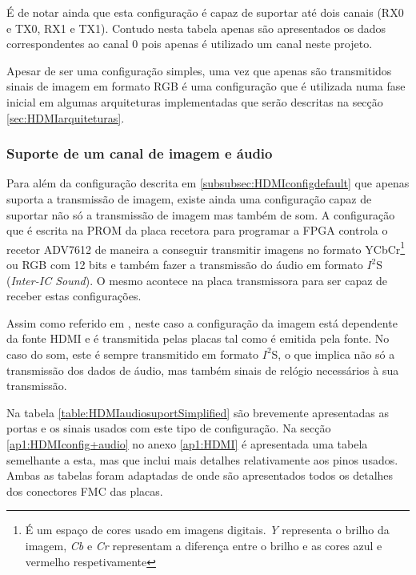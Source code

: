 É de notar ainda que esta configuração é capaz de suportar até dois canais (RX0 e TX0, RX1 e TX1). Contudo nesta tabela apenas são apresentados os dados correspondentes ao canal 0 pois apenas é utilizado um canal neste projeto. 

Apesar de ser uma configuração simples, uma vez que apenas são transmitidos sinais de imagem em formato RGB é uma configuração que é utilizada numa fase inicial em algumas arquiteturas implementadas que serão descritas na secção \ref{sec:HDMIarquiteturas}.

\subsubsection{Suporte de um canal de imagem e áudio} \label {subsubsec:HDMIconfig+audio}

Para além da configuração descrita em \ref{subsubsec:HDMIconfigdefault} que apenas suporta a transmissão de imagem, existe ainda uma configuração capaz de suportar não só a transmissão de imagem mas também de som. A configuração que é escrita na PROM da placa recetora para programar a FPGA controla o recetor ADV7612 de maneira a conseguir transmitir imagens no formato YCbCr\footnote{É um espaço de cores usado em imagens digitais. \textit{Y} representa o brilho da imagem, \textit{Cb} e \textit{Cr} representam a diferença entre o brilho e as cores azul e vermelho respetivamente} ou RGB com 12 bits e também fazer a transmissão do áudio em formato $I^{2}$S (\textit{Inter-IC Sound}). O mesmo acontece na placa transmissora para ser capaz de receber estas configurações.

Assim como referido em \cite{R014}, neste caso a configuração da imagem está dependente da fonte HDMI e é transmitida pelas placas tal como é emitida pela fonte. No caso do som, este é sempre transmitido em formato $I^{2}$S, o que implica não só a transmissão dos dados de áudio, mas também sinais de relógio necessários à sua transmissão.

Na tabela \ref{table:HDMIaudiosuportSimplified} são brevemente apresentadas as portas e os sinais usados com este tipo de configuração. Na secção \ref{ap1:HDMIconfig+audio} no anexo \ref{ap1:HDMI} é apresentada uma tabela semelhante a esta, mas que inclui mais detalhes relativamente aos pinos usados. Ambas as tabelas foram adaptadas de \cite{R014} onde são apresentados todos os detalhes dos conectores FMC das placas.

